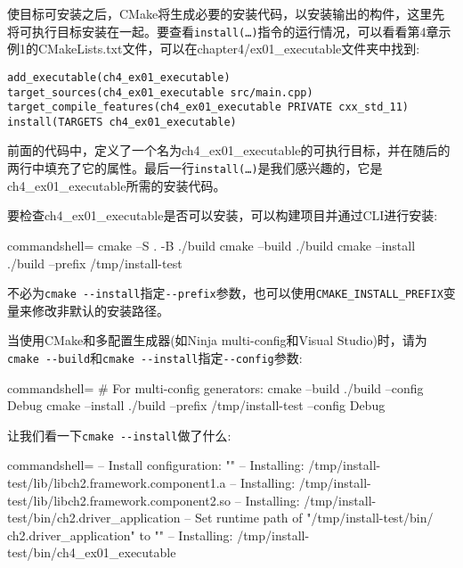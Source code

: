 使目标可安装之后，CMake将生成必要的安装代码，以安装输出的构件，这里先将可执行目标安装在一起。要查看\texttt{install(…)}指令的运行情况，可以看看第4章示例1的CMakeLists.txt文件，可以在chapter4/ex01\_executable文件夹中找到:

\begin{lstlisting}[style=styleCMake]
add_executable(ch4_ex01_executable)
target_sources(ch4_ex01_executable src/main.cpp)
target_compile_features(ch4_ex01_executable PRIVATE cxx_std_11)
install(TARGETS ch4_ex01_executable)
\end{lstlisting}

前面的代码中，定义了一个名为ch4\_ex01\_executable的可执行目标，并在随后的两行中填充了它的属性。最后一行\texttt{install(…)}是我们感兴趣的，它是ch4\_ex01\_executable所需的安装代码。

要检查ch4\_ex01\_executable是否可以安装，可以构建项目并通过CLI进行安装:

\begin{tcblisting}{commandshell={}}
cmake –S . -B ./build
cmake --build ./build
cmake --install ./build --prefix /tmp/install-test
\end{tcblisting}

\begin{tcolorbox}[colback=webgreen!5!white,colframe=webgreen!75!black,title=Note]
不必为\texttt{cmake -{}-install}指定\texttt{-{}-prefix}参数，也可以使用\texttt{CMAKE\_INSTALL\_PREFIX}变量来修改非默认的安装路径。

当使用CMake和多配置生成器(如Ninja multi-config和Visual Studio)时，请为\texttt{cmake -{}-build}和\texttt{cmake -{}-install}指定\texttt{-{}-config}参数:

\begin{tcblisting}{commandshell={}}
# For multi-config generators:
cmake --build ./build --config Debug
cmake --install ./build --prefix /tmp/install-test
--config Debug
\end{tcblisting}
\end{tcolorbox}

让我们看一下\texttt{cmake -{}-install}做了什么:

\begin{tcblisting}{commandshell={}}
-- Install configuration: ""
-- Installing: /tmp/install-test/lib/libch2.framework.component1.a
-- Installing: /tmp/install-test/lib/libch2.framework.component2.so
-- Installing: /tmp/install-test/bin/ch2.driver_application
-- Set runtime path of "/tmp/install-test/bin/
    ch2.driver_application" to ""
-- Installing: /tmp/install-test/bin/ch4_ex01_executable
\end{tcblisting}

